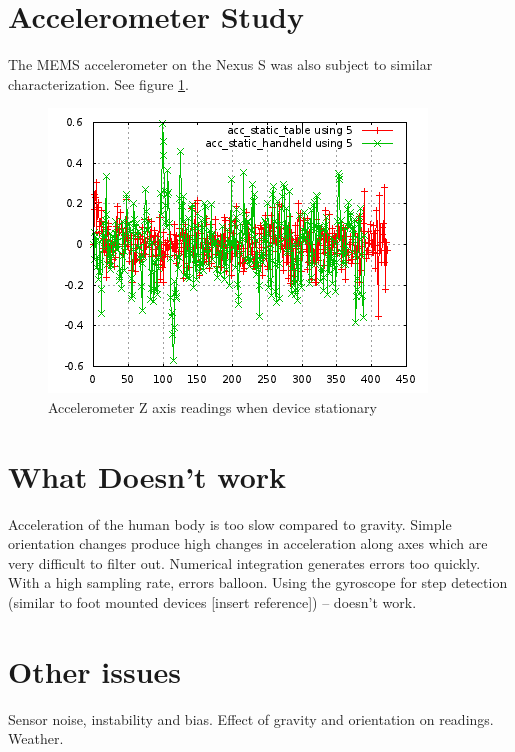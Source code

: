 \section{Accelerometer Study}

The MEMS accelerometer on the Nexus S was also subject to similar characterization.
See figure \ref{fig:accel_static}.

\begin{figure}\centering
    \includegraphics{figures/accel_static.png}
    \caption{Accelerometer Z axis readings when device stationary\label{fig:accel_static}}
\end{figure}


\clearpage
\section{What Doesn’t work}
Acceleration of the human body is too slow compared to gravity. Simple orientation changes produce high changes in acceleration along axes which are very difficult to filter out.
Numerical integration generates errors too quickly. With a high sampling rate, errors balloon.
Using the gyroscope for step detection (similar to foot mounted devices [insert reference]) – doesn’t work.

\section{Other issues}
Sensor noise, instability and bias. Effect of gravity and orientation on readings. Weather.

